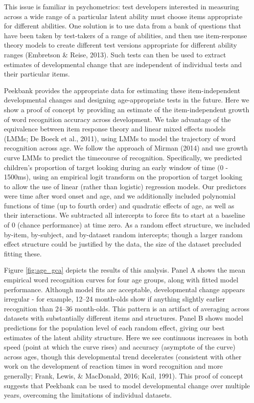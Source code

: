 \documentclass[10pt, letterpaper]{article}
\begin{document}
This issue is familiar in psychometrics: test developers interested in
measuring across a wide range of a particular latent ability must choose
items appropriate for different abilities. One solution is to use data
from a bank of questions that have been taken by test-takers of a range
of abilities, and then use item-response theory models to create
different test versions appropriate for different ability ranges
(Embretson \& Reise, 2013). Such tests can then be used to extract
estimates of developmental change that are independent of individual
tests and their particular items.

Peekbank provides the appropriate data for estimating these
item-independent developmental changes and designing age-appropriate
tests in the future. Here we show a proof of concept by providing an
estimate of the item-independent growth of word recognition accuracy
across development. We take advantage of the equivalence between item
response theory and linear mixed effects models (LMMs; De Boeck et al.,
2011), using LMMs to model the trajectory of word recognition across
age. We follow the approach of Mirman (2014) and use growth curve LMMs
to predict the timecourse of recognition. Specifically, we predicted
children's proportion of target looking during an early window of time
(0 - 1500ms), using an empirical logit transform on the proportion of
target looking to allow the use of linear (rather than logistic)
regression models. Our predictors were time after word onset and age,
and we additionally included polynomial functions of time (up to fourth
order) and quadratic effects of age, as well as their interactions. We
subtracted all intercepts to force fits to start at a baseline of 0
(chance performance) at time zero. As a random effect structure, we
included by-item, by-subject, and by-dataset random intercepts; though a
larger random effect structure could be justified by the data, the size
of the dataset precluded fitting these.

Figure \ref{fig:age_gca} depicts the results of this analysis. Panel A
shows the mean empirical word recognition curves for four age groups,
along with fitted model performance. Although model fits are acceptable,
developmental change appears irregular - for example, 12--24 month-olds
show if anything slightly earlier recognition than 24--36 month-olds.
This pattern is an artifact of averaging across datasets with
substantially different items and structures. Panel B shows model
predictions for the population level of each random effect, giving our
best estimates of the latent ability structure. Here we see continuous
increases in both speed (point at which the curve rises) and accuracy
(asymptote of the curve) across ages, though this developmental trend
decelerates (consistent with other work on the development of reaction
times in word recognition and more generally; Frank, Lewis, \&
MacDonald, 2016; Kail, 1991). This proof of concept suggests that
Peekbank can be used to model developmental change over multiple years,
overcoming the limitations of individual datasets.
\end{document}
